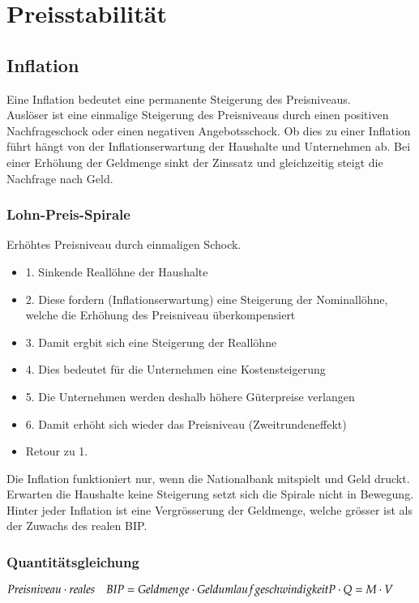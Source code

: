 \section{Preisstabilität}
\subsection{Inflation}
Eine Inflation bedeutet eine permanente Steigerung des Preisniveaus.\\
Auslöser ist eine einmalige Steigerung des Preisniveaus durch einen positiven Nachfrageschock oder einen negativen Angebotsschock. Ob dies zu einer Inflation führt hängt von der Inflationserwartung der Haushalte und Unternehmen ab. Bei einer Erhöhung der Geldmenge sinkt der Zinssatz und gleichzeitig steigt die Nachfrage nach Geld. 
\subsubsection{Lohn-Preis-Spirale}
Erhöhtes Preisniveau durch einmaligen Schock.
\begin{itemize}
	\item 1. Sinkende Reallöhne der Haushalte
	\item 2. Diese fordern (Inflationserwartung) eine Steigerung der Nominallöhne, welche die Erhöhung des Preisniveau überkompensiert
	\item 3. Damit ergbit sich eine Steigerung der Reallöhne
	\item 4. Dies bedeutet für die Unternehmen eine Kostensteigerung
	\item 5. Die Unternehmen werden deshalb höhere Güterpreise verlangen
	\item 6. Damit erhöht sich wieder das Preisniveau (Zweitrundeneffekt)
	\item Retour zu 1.
\end{itemize}
Die Inflation funktioniert nur, wenn die Nationalbank mitspielt und Geld druckt. Erwarten die Haushalte keine Steigerung setzt sich die Spirale nicht in Bewegung. Hinter jeder Inflation ist eine Vergrösserung der Geldmenge, welche grösser ist als der Zuwachs des realen BIP. 
\subsubsection{Quantitätsgleichung}
	$Preisniveau \cdot reales\quad BIP = Geldmenge \cdot Geldumlaufgeschwindigkeit \\
	P \cdot Q = M \cdot V$
